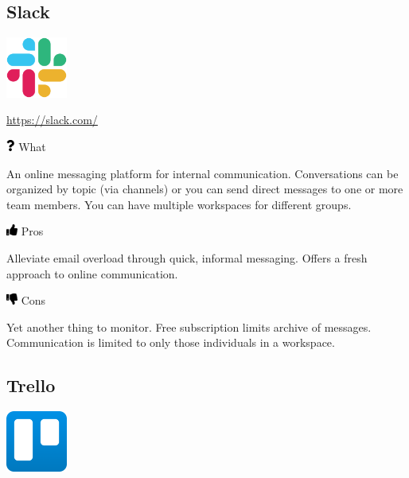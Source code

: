 \documentclass[
  letterpaper,
  DIV=11,
  numbers=noendperiod]{scrreprt}
\begin{document}
\hypertarget{slack}{%
\subsection{Slack}\label{slack}}

\includegraphics[width=0.15\textwidth,height=\textheight]{./img/slack-logo-icon.png}

\url{https://slack.com/}

\includegraphics[width=0.75em,height=1em]{./collaborate_files/figure-pdf/fa-icon-8447cf12acba1bc263badfefa79f6dd7.pdf}
What

An online messaging platform for internal communication. Conversations
can be organized by topic (via channels) or you can send direct messages
to one or more team members. You can have multiple workspaces for
different groups.

\includegraphics[width=1em,height=1em]{./collaborate_files/figure-pdf/fa-icon-e4ee65476be467d7be8a1ae9cb02ffda.pdf}
Pros

Alleviate email overload through quick, informal messaging. Offers a
fresh approach to online communication.

\includegraphics[width=1em,height=1em]{./collaborate_files/figure-pdf/fa-icon-c9ddf618df48250f2c0ed0cb59d4f20d.pdf}
Cons

Yet another thing to monitor. Free subscription limits archive of
messages. Communication is limited to only those individuals in a
workspace.

\hypertarget{trello}{%
\subsection{Trello}\label{trello}}

\includegraphics[width=0.15\textwidth,height=\textheight]{./img/trello.png}
\end{document}
